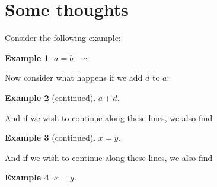 \documentclass{article}
\newtheorem{example}{Example}
\newenvironment{contexample}{
		\addtocounter{example}{-1} \begin{example}[continued]%
	}{\end{example}}
\begin{document}
 

\section{Some thoughts}

Consider the following example:

\begin{example}
$a = b + c$.
\end{example}

Now consider what happens if we add $d$ to $a$:

\begin{contexample}
$a + d$.
\end{contexample}

And if we wish to continue along these lines, we also find

\begin{contexample}
$x = y$.
\end{contexample}

And if we wish to continue along these lines, we also find

\begin{example}
$x = y$.
\end{example}
\end{document}
